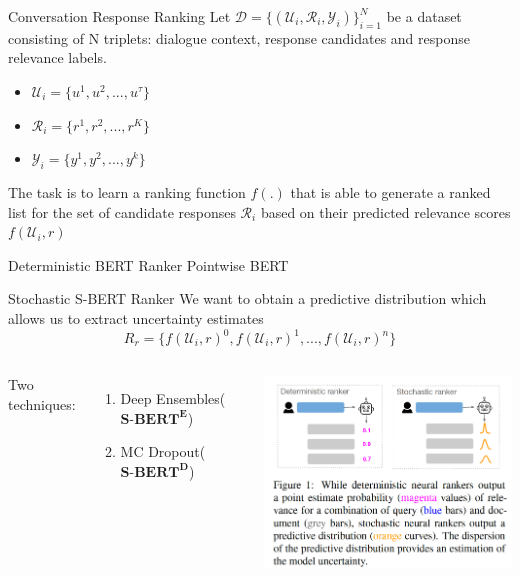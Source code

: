 \documentclass{beamer}
\begin{document}
\begin{frame}{Conversation Response Ranking}
Let $\mathcal{D} = \{(\mathcal{U}_i, \mathcal{R}_i, \mathcal{Y}_i) \}_{i=1}^N $ be a dataset consisting of N triplets: dialogue context, response candidates and response relevance labels.
\begin{itemize}
    \item $\mathcal{U}_i = \{u^1, u^2, ..., u^{\tau}\}$
    \item $\mathcal{R}_i = \{r^1, r^2, ..., r^K \}$
    \item $\mathcal{Y}_i = \{y^1, y^2, ..., y^k \}$
\end{itemize}
The task is to learn a ranking function $f(.)$ that is able to generate a
ranked list for the set of candidate responses $\mathcal{R}_i$
based on their predicted relevance scores $f(\mathcal{U}_i, r)$
\end{frame}

\begin{frame}{Deterministic BERT Ranker}
Pointwise BERT
    
\end{frame}

\begin{frame}{Stochastic S-BERT Ranker}
We want to obtain a predictive distribution which allows us to extract uncertainty estimates
\begin{equation}
    R_r = \{ f(\mathcal{U}_i, r)^0, f(\mathcal{U}_i, r)^1, ..., f(\mathcal{U}_i, r)^n \}
\end{equation}

\begin{columns}

Two techniques:
\begin{enumerate}
    \item Deep Ensembles($\textbf{S-BERT}^\textbf{E}$)
    \item MC Dropout($\textbf{S-BERT}^\textbf{D}$)
\end{enumerate}

\includegraphics[scale=0.3]{figure1.png}
\end{columns}

\end{frame}
\end{document}
